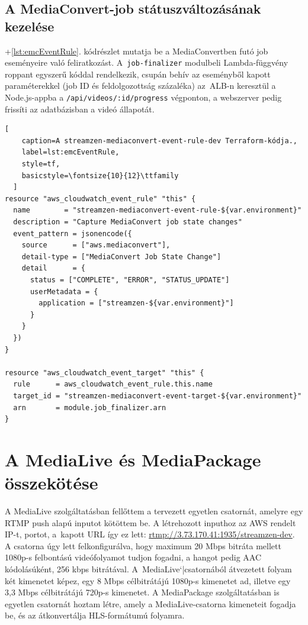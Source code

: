 \subsection{A MediaConvert-job státuszváltozásának kezelése}

\Az+\ref{lst:emcEventRule}. kódrészlet mutatja be a MediaConvertben futó job eseményeire való feliratkozást. A~\verb|job-finalizer| modulbeli Lambda-függvény roppant egyszerű kóddal rendelkezik, csupán behív az eseményből kapott paraméterekkel (job ID és feldolgozottság százaléka) az~ALB-n keresztül a Node.js-appba a \verb|/api/videos/:id/progress| végponton, a webszerver pedig frissíti az adatbázisban a videó állapotát.

\begin{minipage}{0.92\textwidth}
  \begin{lstlisting}[
    caption=A streamzen-mediaconvert-event-rule-dev Terraform-kódja.,
    label=lst:emcEventRule,
    style=tf,
    basicstyle=\fontsize{10}{12}\ttfamily
  ]
resource "aws_cloudwatch_event_rule" "this" {
  name        = "streamzen-mediaconvert-event-rule-${var.environment}"
  description = "Capture MediaConvert job state changes"
  event_pattern = jsonencode({
    source      = ["aws.mediaconvert"],
    detail-type = ["MediaConvert Job State Change"]
    detail      = {
      status = ["COMPLETE", "ERROR", "STATUS_UPDATE"]
      userMetadata = {
        application = ["streamzen-${var.environment}"]
      }
    }
  })
}

resource "aws_cloudwatch_event_target" "this" {
  rule      = aws_cloudwatch_event_rule.this.name
  target_id = "streamzen-mediaconvert-event-target-${var.environment}"
  arn       = module.job_finalizer.arn
}
\end{lstlisting}
\end{minipage}

\section{A MediaLive és MediaPackage összekötése}\label{sec:mediaLive}

A MediaLive szolgáltatásban fellőttem a tervezett egyetlen csatornát, amelyre egy RTMP push alapú inputot kötöttem be. A létrehozott inputhoz az AWS rendelt IP-t, portot, a~kapott URL így ez lett: \url{rtmp://3.73.170.41:1935/streamzen-dev}. A csatorna úgy lett felkonfigurálva, hogy maximum 20 Mbps bitráta mellett 1080p-s felbontású videófolyamot tudjon fogadni, a hangot pedig AAC kódolásúként, 256 kbps bitrátával. A~MediaLive`|csatornából átvezetett folyam két kimenetet képez, egy 8 Mbps célbitrátájú 1080p-s kimenetet ad, illetve egy 3,3 Mbps célbitrátájú 720p-s kimenetet. A MediaPackage szolgáltatásban is egyetlen csatornát hoztam létre, amely a MediaLive-csatorna kimeneteit fogadja be, és az átkonvertálja HLS-formátumú folyamra.

